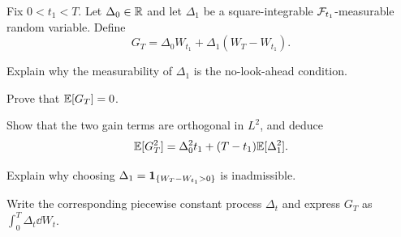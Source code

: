 \begin{exercise}
Fix \(0<t_1<T\). Let \(\Delta_0\in\mathbb{R}\) and let \(\Delta_1\) be a
square-integrable \(\mathcal{F}_{t_1}\)-measurable random variable. Define
\[
G_T=\Delta_0W_{t_1}+\Delta_1(W_T-W_{t_1}).
\]
\begin{exparts}
  \item Explain why the measurability of \(\Delta_1\) is the no-look-ahead
  condition.
  \item Prove that \(\mathbb{E}[G_T]=0\).
  \item Show that the two gain terms are orthogonal in \(L^2\), and deduce
  \[
  \mathbb{E}[G_T^2]
  =\Delta_0^2t_1+(T-t_1)\mathbb{E}[\Delta_1^2].
  \]
  \item Explain why choosing
  \(\Delta_1=\mathbf{1}_{\{W_T-W_{t_1}>0\}}\) is inadmissible.
  \item Write the corresponding piecewise constant process \(\Delta_t\)
  and express \(G_T\) as \(\int_0^T\Delta_t\dd W_t\).
\end{exparts}
\end{exercise}
